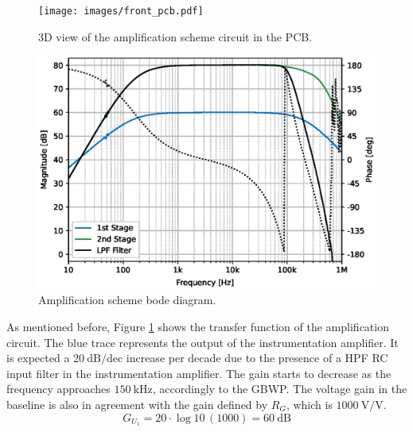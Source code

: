 
\begin{figure}[!ht]
    \centering
    \begin{minipage}{0.45\textwidth}
        \centering
        \texttt{[image: images/front\_pcb.pdf]}
        \caption{3D view of the amplification scheme circuit in the PCB.}
        \label{figure:amp-pcb}
    \end{minipage}\hfill
    \begin{minipage}{0.45\textwidth}
        \centering
        \includegraphics[width=\textwidth]{images/chapter_4/channel/amp_bode_v2.eps}
        \caption{Amplification scheme bode diagram.}
        \label{figure:amp-bode}
    \end{minipage}
\end{figure}

As mentioned before, Figure \ref{figure:amp-bode} shows the transfer function of the amplification circuit. The blue trace represents the output of the instrumentation amplifier. It is expected a $\mathrm{20~dB/dec}$ increase per decade due to the presence of a \ac{HPF} \ac{RC} input filter in the instrumentation amplifier. The gain starts to decrease as the frequency approaches $\mathrm{150~kHz}$, accordingly to the \ac{GBWP}. The voltage gain in the baseline is also in agreement with the gain defined by $R_G$, which is $\mathrm{1000~V/V}$.
\begin{equation}
     \nonumber G_{U_1} = 20\cdot \log{10}\,(1000) = 60~\mathrm{dB}
\end{equation}

